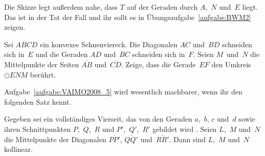 Die Skizze legt außerdem nahe, dass $T$ auf der Geraden durch $A$,~$N$ und~$E$ liegt. Das ist in der Tat der Fall und ihr sollt es in Übungsaufgabe~\ref{aufgabe:BWM2} zeigen.

\begin{aufgabe*}[*]\label{aufgabe:VAIMO2008_5}
	Sei $ABCD$ ein konvexes Sehnenviereck. Die Diagonalen $AC$ und~$BD$ schneiden sich in~$E$ und die Geraden $AD$ und~$BC$ schneiden sich in~$F$. Seien $M$~und~$N$ die Mittelpunkte der Seiten $\overline{AB}$ und~$\overline{CD}$. Zeige, dass die Gerade~$EF$ den Umkreis $\odot ENM$ berührt.
\end{aufgabe*}

Aufgabe~\ref{aufgabe:VAIMO2008_5} wird wesentlich machbarer, wenn ihr den folgenden Satz kennt.

\begin{satzmitnamen}
	Gegeben sei ein vollständiges Vierseit, das von den Geraden $a$,~$b$, $c$ und~$d$ sowie ihren Schnittpunkten $P$,~$Q$,~$R$ und $P'$,~$Q'$,~$R'$ gebildet wird . Seien $L$,~$M$ und~$N$ die Mittelpunkte der Diagonalen $\overline{PP'}$, $\overline{QQ'}$ und~$\overline{RR'}$. Dann sind $L$,~$M$ und~$N$ kollinear.
\end{satzmitnamen}

